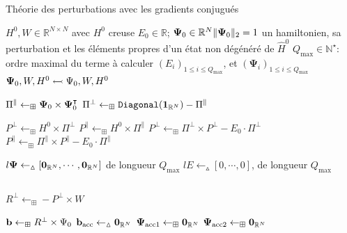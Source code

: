 \documentclass[svgnames,dvipsnames,a4paper,10pt,french]{report}
\begin{document}
\begin{appendices}
\begin{algorithm}
\caption{Théorie des perturbations avec les gradients  conjugués}
\label{alg:conj_grad_pert}
\begin{algorithmic}[1]
\Require $H^0, W \in \mathbb{R}^{N \times N}$ avec $H^0$ creuse $E_0 \in \mathbb{R}$; $\mathbf{\Psi}_0 \in \mathbb{R}^N \/ \|\mathbf{\Psi}_0 \|_2 = 1$ un hamiltonien, sa perturbation et les éléments propres d'un état non dégénéré de $\hat{H}^0$
\Require $Q_{\text{max}}\in \mathbb{N}^\star$: ordre maximal du terme à calculer
\Ensure $(E_i)_{1\le i \le Q_{\text{max}}}$, et $(\mathbf{\Psi}_i)_{1\le i \le Q_{\text{max}}}$
\[\]
\State {}
\State {}
\State {}
\State {}
\[\]
\State $\mathbf{\Psi}_0, W, H^0 \leftarrowtail \Psi_0, W, H^0$ 

\[\]
\State $\Pi^\parallel \gets_\boxplus \mathbf{\Psi}_0 \times \mathbf{\Psi}_0^\intercal$ 
\State $\Pi^\perp \gets_\boxplus \codeword{Diagonal}(\vect{1}_{\mathbb{R}^N}) - \Pi^\parallel$ 



\[\]
\State $P^\perp \gets_\boxplus H^0 \times \Pi^\perp$ 
\State $P^\parallel \gets_\boxplus H^0 \times \Pi^\parallel$
\State $P^\perp \gets_\boxplus \Pi^\perp \times P^\perp -E_0 \cdot \Pi^\perp$ 
\State $P^\parallel \gets_\boxplus \Pi^\parallel \times P^\parallel -E_0 \cdot \Pi^\parallel $
\[\]



\State $l\mathbf{\Psi} \gets_\vartriangle [\mathbf{0}_{\mathbb{R}^N}, \cdots, \mathbf{0}_{\mathbb{R}^N}]$ de longueur $Q_{\text{max}}$ 
\State $lE \gets_\vartriangle [0, \cdots, 0]$, de longueur $Q_{\text{max}}$

\[\]



\State $R^\perp \gets_\boxplus - P^\perp \times W$ 

\State $\mathbf{b} \gets_\boxplus R^\perp \times \Psi_0$ 
\State $\mathbf{b}_{\text{acc}} \gets_\vartriangle \mathbf{0}_{\mathbb{R}^N}$ 
\State $\mathbf{\Psi}_{\text{acc}1} \gets_\boxplus  \mathbf{0}_{\mathbb{R}^N}$  
\State $\mathbf{\Psi}_{\text{acc}2} \gets_\boxplus  \mathbf{0}_{\mathbb{R}^N}$ 


\end{algorithmic}
\end{algorithm}
\end{appendices}
\end{document}
